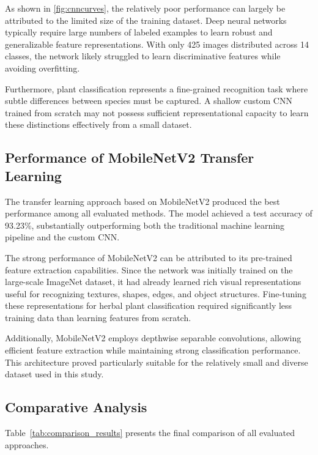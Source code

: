 As shown in \cref{fig:cnncurves}, the relatively poor performance can largely be attributed to the limited size of the training dataset. Deep neural networks typically require large numbers of labeled examples to learn robust and generalizable feature representations. With only 425 images distributed across 14 classes, the network likely struggled to learn discriminative features while avoiding overfitting.

Furthermore, plant classification represents a fine-grained recognition task where subtle differences between species must be captured. A shallow custom CNN trained from scratch may not possess sufficient representational capacity to learn these distinctions effectively from a small dataset.

\subsection{Performance of MobileNetV2 Transfer Learning}

The transfer learning approach based on MobileNetV2 produced the best performance among all evaluated methods. The model achieved a test accuracy of 93.23\%, substantially outperforming both the traditional machine learning pipeline and the custom CNN.




The strong performance of MobileNetV2 can be attributed to its pre-trained feature extraction capabilities. Since the network was initially trained on the large-scale ImageNet dataset, it had already learned rich visual representations useful for recognizing textures, shapes, edges, and object structures. Fine-tuning these representations for herbal plant classification required significantly less training data than learning features from scratch.

Additionally, MobileNetV2 employs depthwise separable convolutions, allowing efficient feature extraction while maintaining strong classification performance. This architecture proved particularly suitable for the relatively small and diverse dataset used in this study.

\subsection{Comparative Analysis}

Table~\ref{tab:comparison_results} presents the final comparison of all evaluated approaches.

